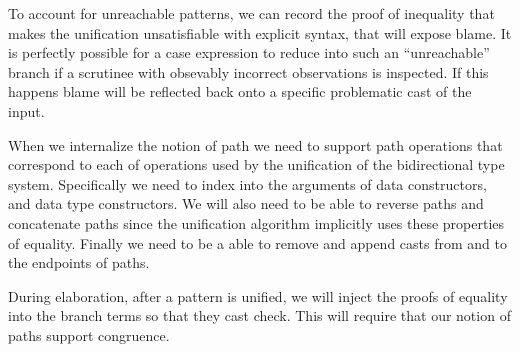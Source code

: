 To account for unreachable patterns, we can record the proof of inequality that makes the unification unsatisfiable with explicit syntax, that will expose blame.
It is perfectly possible for a case expression to reduce into such an ``unreachable'' branch if a scrutinee with obsevably incorrect observations is inspected.
If this happens blame will be reflected back onto a specific problematic cast of the input.

When we internalize the notion of path we need to support path operations that correspond to each of operations used by the unification of the bidirectional type system.
Specifically we need to index into the arguments of data constructors, and data type constructors.
We will also need to be able to reverse paths and concatenate paths since the unification algorithm implicitly uses these properties of equality.
Finally we need to be a able to remove and append casts from and to the endpoints of paths.

During elaboration, after a pattern is unified, we will inject the proofs of equality into the branch terms so that they cast check.
This will require that our notion of paths support congruence.



% 
% 
% 
